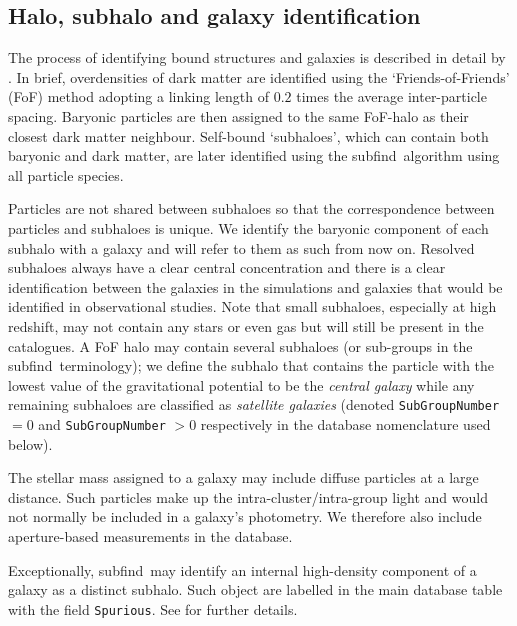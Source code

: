 \documentclass[10pt, a4paper]{article}
\newcommand{\subfind}{{\sc subfind}}
\begin{document}
\subsection{Halo, subhalo and galaxy identification}

The process of identifying bound structures and galaxies is described in detail by \cite{2015MNRAS.446..521S}. In brief, overdensities of dark matter are identified using the `Friends-of-Friends' (FoF) method \cite{1985ApJ...292..371D} adopting a linking length of $0.2$ times the average inter-particle spacing. Baryonic particles are then assigned to the same FoF-halo as their closest dark matter neighbour. Self-bound `subhaloes', which can contain both baryonic and dark matter, are later identified using the \subfind\ algorithm \cite{2001MNRAS.328..726S,2009MNRAS.399..497D} using all particle species.

Particles are not shared between subhaloes so that the correspondence between particles and subhaloes is unique. We identify the baryonic component of each subhalo with a galaxy and will refer to them as such from now on. Resolved subhaloes always have a clear central concentration and there is a clear identification between the galaxies in the simulations and galaxies that would be identified in observational studies. Note that small subhaloes, especially at high redshift, may not contain any stars or even gas but will still be present in the catalogues. A FoF halo may contain several subhaloes (or sub-groups in the \subfind\ terminology); we define the subhalo that contains the particle with the lowest value of the gravitational potential to be the \emph{central galaxy} while any remaining subhaloes are classified as \emph{satellite galaxies} (denoted \texttt{SubGroupNumber} $= 0$ and \texttt{SubGroupNumber} $> 0$ respectively in the database nomenclature used below).

The stellar mass assigned to a galaxy may include diffuse particles at a large distance. Such particles make up the intra-cluster/intra-group light and would not normally be included in a galaxy's photometry. We therefore also include aperture-based measurements in the database. 

Exceptionally, \subfind\ may identify an internal high-density component of a galaxy as a distinct subhalo. Such object are labelled in the main database table with the field {\tt Spurious}. See \citet[][sec.~4]{2016AnC....15...72M} for further details.
\end{document}
